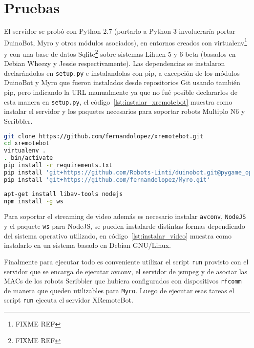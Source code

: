 \chapter{Pruebas}\label{cha:pruebas}

El servidor se probó con Python 2.7 (portarlo a Python 3 involucraría
portar DuinoBot, Myro y otros módulos asociados), en entornos creados
con virtualenv\footnote{FIXME REF} y con una base de datos
Sqlite\footnote{FIXME REF}
sobre
sistemas Lihuen 5 y 6 beta (basados en Debian Wheezy y Jessie respectivamente).
Las dependencias se instalaron declarándolas en \texttt{setup.py} e instalandolas
con pip, a excepción de los módulos DuinoBot y Myro que fueron instalados
desde repositorios Git usando también pip, pero indicando la URL manualmente
ya que no fué posible declararlos de esta manera en \texttt{setup.py}, el
código~\ref{lst:instalar_xremotebot} muestra como instalar el servidor
y los paquetes necesarios para soportar robots Multiplo N6 y Scribbler.

\begin{lstlisting}[language=bash,
caption={Instalación de XRemoteBot},
label=lst:instalar_xremotebot]
git clone https://github.com/fernandolopez/xremotebot.git
cd xremotebot
virtualenv .
. bin/activate
pip install -r requirements.txt
pip install 'git+https://github.com/Robots-Linti/duinobot.git@pygame_opcional'
pip install 'git+https://github.com/fernandolopez/Myro.git'
\end{lstlisting}

\begin{lstlisting}[language=bash,
caption={Instalación del soporte de video para XRemoteBot},
label=lst:instalar_video]
apt-get install libav-tools nodejs
npm install -g ws
\end{lstlisting}

Para soportar el streaming de video además es necesario instalar
\texttt{avconv}, \texttt{NodeJS} y el paquete \texttt{ws} para NodeJS,
se pueden instalarde distintas formas dependiendo del sistema operativo
utilizado, en código~\ref{lst:instalar_video} muestra como instalarlo
en un sistema basado en Debian GNU/Linux.

Finalmente para ejecutar todo es conveniente utilizar el script
\texttt{run} provisto con el servidor que se encarga de ejecutar
avconv, el servidor de jsmpeg y de asociar las MACs de los
robots Scribbler que hubiera configurados con dispositivos
\texttt{rfcomm} de manera que queden utilizables para \texttt{Myro}.
Luego de ejecutar esas tareas el script \texttt{run} ejecuta
el servidor XRemoteBot.

